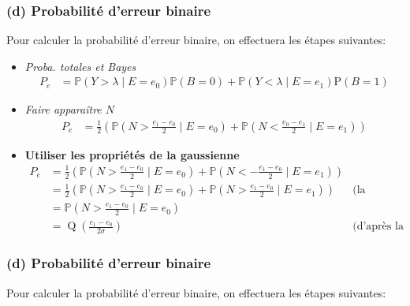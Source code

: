 \documentclass[11pt]{article}
\begin{document}
    \hypertarget{d-probabilituxe9-derreur-binaire}{%
\subsubsection{(d) Probabilité d'erreur
binaire}\label{d-probabilituxe9-derreur-binaire}}

Pour calculer la probabilité d'erreur binaire, on effectuera les étapes
suivantes:

\begin{itemize}
\item
  \emph{Proba. totales et Bayes} \begin{align}
    P_e &= \mathbb{P}(Y>\lambda \mid E=e_0) \mathbb{P}(B=0)+\mathbb{P}(Y<\lambda \mid E=e_1) \mathrm{P}(B=1)
  \end{align}
\item
  \emph{Faire apparaître \(N\)} \begin{align}
     P_e &= \frac{1}{2}\left(\mathbb{P}\left(N>\frac{e_1-e_0}{2} \mid E=e_0\right) + \mathbb{P}\left(N<\frac{e_0-e_1}{2} \mid E=e_1\right)\right)
  \end{align}
\item
  \textbf{Utiliser les propriétés de la gaussienne} \begin{align}
    P_e &= \frac{1}{2}\left(\mathbb{P}\left(N>\frac{e_1-e_0}{2} \mid E=e_0\right) + \mathbb{P}\left(N<-\frac{e_1-e_0}{2} \mid E=e_1\right)\right)\\
        &= \frac{1}{2}\left(\mathbb{P}\left(N>\frac{e_1-e_0}{2} \mid E=e_0\right) + \mathbb{P}\left(N>\frac{e_1-e_0}{2} \mid E=e_1\right)\right) &\text{(la gaussienne est symétrique)}\\
        &= \mathbb{P}\left(N>\frac{e_1-e_0}{2} \mid E=e_0\right)\\
        &= \operatorname{Q}\left(\frac{e_1-e_0}{2\sigma}\right)&\text{(d'après la question 2.(b))}
  \end{align}
\end{itemize}

    \hypertarget{d-probabilituxe9-derreur-binaire}{%
\subsubsection{(d) Probabilité d'erreur
binaire}\label{d-probabilituxe9-derreur-binaire}}

Pour calculer la probabilité d'erreur binaire, on effectuera les étapes
suivantes:
\end{document}
